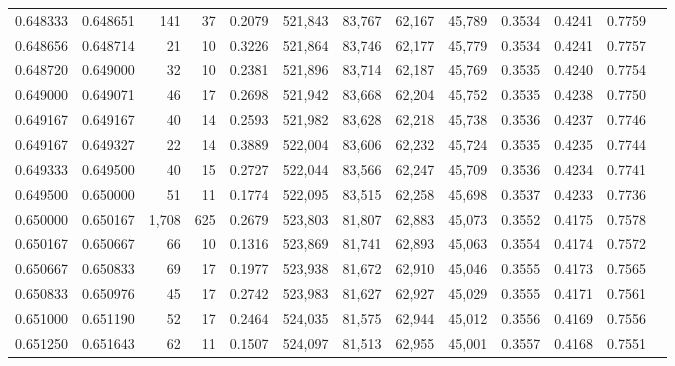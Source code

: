 \begin{tabular}{rrrrrrrrrrrrr}
0.648333 & 0.648651 &   141 &  37 &                                     0.2079 & 521,843 &  83,767 &  62,167 &  45,789 & 0.3534 & 0.4241 & 0.7759 \\
0.648656 & 0.648714 &    21 &  10 &                                     0.3226 & 521,864 &  83,746 &  62,177 &  45,779 & 0.3534 & 0.4241 & 0.7757 \\
0.648720 & 0.649000 &    32 &  10 &                                     0.2381 & 521,896 &  83,714 &  62,187 &  45,769 & 0.3535 & 0.4240 & 0.7754 \\
0.649000 & 0.649071 &    46 &  17 &                                     0.2698 & 521,942 &  83,668 &  62,204 &  45,752 & 0.3535 & 0.4238 & 0.7750 \\
0.649167 & 0.649167 &    40 &  14 &                                     0.2593 & 521,982 &  83,628 &  62,218 &  45,738 & 0.3536 & 0.4237 & 0.7746 \\
0.649167 & 0.649327 &    22 &  14 &                                     0.3889 & 522,004 &  83,606 &  62,232 &  45,724 & 0.3535 & 0.4235 & 0.7744 \\
0.649333 & 0.649500 &    40 &  15 &                                     0.2727 & 522,044 &  83,566 &  62,247 &  45,709 & 0.3536 & 0.4234 & 0.7741 \\
0.649500 & 0.650000 &    51 &  11 &                                     0.1774 & 522,095 &  83,515 &  62,258 &  45,698 & 0.3537 & 0.4233 & 0.7736 \\
0.650000 & 0.650167 & 1,708 & 625 &                                     0.2679 & 523,803 &  81,807 &  62,883 &  45,073 & 0.3552 & 0.4175 & 0.7578 \\
0.650167 & 0.650667 &    66 &  10 &                                     0.1316 & 523,869 &  81,741 &  62,893 &  45,063 & 0.3554 & 0.4174 & 0.7572 \\
0.650667 & 0.650833 &    69 &  17 &                                     0.1977 & 523,938 &  81,672 &  62,910 &  45,046 & 0.3555 & 0.4173 & 0.7565 \\
0.650833 & 0.650976 &    45 &  17 &                                     0.2742 & 523,983 &  81,627 &  62,927 &  45,029 & 0.3555 & 0.4171 & 0.7561 \\
0.651000 & 0.651190 &    52 &  17 &                                     0.2464 & 524,035 &  81,575 &  62,944 &  45,012 & 0.3556 & 0.4169 & 0.7556 \\
0.651250 & 0.651643 &    62 &  11 &                                     0.1507 & 524,097 &  81,513 &  62,955 &  45,001 & 0.3557 & 0.4168 & 0.7551 \\

\end{tabular}
